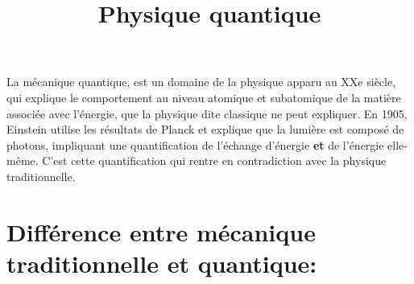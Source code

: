 \documentclass{article}
\author{}
\date{}
\title{Physique quantique}
\begin{document}
\maketitle

La mécanique quantique, est un domaine de la physique apparu au XXe siècle, qui explique le comportement au niveau atomique et subatomique de la matière associée avec l'énergie, que la physique dite classique ne peut expliquer.\newline
\indent En 1905, Einstein utilise les résultats de Planck et explique que la lumière est composé de photons, impliquant une quantification de l'échange d'énergie \textbf{et} de l'énergie elle-même. C'est cette quantification qui rentre en contradiction avec la physique traditionnelle.

\section{Différence entre mécanique traditionnelle et quantique:}
\end{document}
